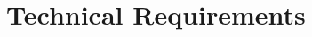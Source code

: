\section{Technical Requirements}
\newpage\afterpage{\FloatBarrier}
\newpage\afterpage{\FloatBarrier}
